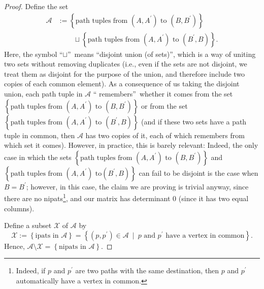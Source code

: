 \begin{definition}
\begin{proof}
Define the set%
\begin{align*}
\mathcal{A}  &  :=\left\{  \text{path tuples from }\left(  A,A^{\prime
}\right)  \text{ to }\left(  B,B^{\prime}\right)  \right\} \\
&  \ \ \ \ \ \ \ \ \ \ \sqcup\left\{  \text{path tuples from }\left(
A,A^{\prime}\right)  \text{ to }\left(  B^{\prime},B\right)  \right\}  .
\end{align*}
Here, the symbol \textquotedblleft$\sqcup$\textquotedblright\ means
\textquotedblleft disjoint union (of sets)\textquotedblright, which is a way
of uniting two sets without removing duplicates (i.e., even if the sets are
not disjoint, we treat them as disjoint for the purpose of the union, and
therefore include two copies of each common element). As a consequence of us
taking the disjoint union, each path tuple in $\mathcal{A}$ \textquotedblleft
remembers\textquotedblright\ whether it comes from the set \newline$\left\{
\text{path tuples from }\left(  A,A^{\prime}\right)  \text{ to }\left(
B,B^{\prime}\right)  \right\}  $ or from the set \newline$\left\{  \text{path
tuples from }\left(  A,A^{\prime}\right)  \text{ to }\left(  B^{\prime
},B\right)  \right\}  $ (and if these two sets have a path tuple in common,
then $\mathcal{A}$ has two copies of it, each of which remembers from which
set it comes). However, in practice, this is barely relevant: Indeed, the only
case in which the sets \newline$\left\{  \text{path tuples from }\left(
A,A^{\prime}\right)  \text{ to }\left(  B,B^{\prime}\right)  \right\}  $ and
$\left\{  \text{path tuples from }\left(  A,A^{\prime}\right)  \text{ to
}\left(  B^{\prime},B\right)  \right\}  $ can fail to be disjoint is the case
when $B=B^{\prime}$; however, in this case, the claim we are proving is
trivial anyway, since there are no nipats\footnote{Indeed, if $p$ and
$p^{\prime}$ are two paths with the same destination, then $p$ and $p^{\prime
}$ automatically have a vertex in common.}, and our matrix has determinant $0$
(since it has two equal columns).

Define a subset $\mathcal{X}$ of $\mathcal{A}$ by%
\[
\mathcal{X}:=\left\{  \text{ipats in }\mathcal{A}\right\}  =\left\{  \left(
p,p^{\prime}\right)  \in\mathcal{A}\ \mid\ p\text{ and }p^{\prime}\text{ have
a vertex in common}\right\}  .
\]
Hence, $\mathcal{A}\setminus\mathcal{X}=\left\{  \text{nipats in }%
\mathcal{A}\right\}  $.


\end{proof}
\end{definition}
